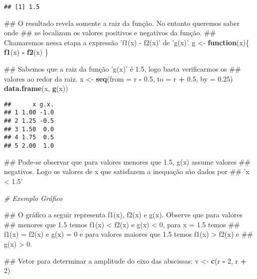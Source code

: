 \documentclass[]{book}
\newenvironment{Shaded}{\begin{snugshade}}{\end{snugshade}}
\newcommand{\KeywordTok}[1]{\textcolor[rgb]{0.13,0.29,0.53}{\textbf{#1}}}
\newcommand{\DataTypeTok}[1]{\textcolor[rgb]{0.13,0.29,0.53}{#1}}
\newcommand{\DecValTok}[1]{\textcolor[rgb]{0.00,0.00,0.81}{#1}}
\newcommand{\FloatTok}[1]{\textcolor[rgb]{0.00,0.00,0.81}{#1}}
\newcommand{\StringTok}[1]{\textcolor[rgb]{0.31,0.60,0.02}{#1}}
\newcommand{\CommentTok}[1]{\textcolor[rgb]{0.56,0.35,0.01}{\textit{#1}}}
\newcommand{\ControlFlowTok}[1]{\textcolor[rgb]{0.13,0.29,0.53}{\textbf{#1}}}
\newcommand{\OperatorTok}[1]{\textcolor[rgb]{0.81,0.36,0.00}{\textbf{#1}}}
\newcommand{\NormalTok}[1]{#1}
\begin{document}
\begin{enumerate}
\begin{verbatim}
## [1] 1.5
\end{verbatim}

\begin{Shaded}
\begin{Highlighting}[]
\NormalTok{##  O resultado revela somente a raiz da função. No entanto queremos saber onde}
\NormalTok{## se localizam os valores positivos e negativos da função.}
\NormalTok{##  Chamaremos nessa etapa a expressão 'f1(x) - f2(x)' de 'g(x)'.}
\NormalTok{g <-}\StringTok{ }\ControlFlowTok{function}\NormalTok{(x)\{}
  \KeywordTok{f1}\NormalTok{(x) }\OperatorTok{-}\StringTok{ }\KeywordTok{f2}\NormalTok{(x)}
\NormalTok{\}}

\NormalTok{##  Sabemos que a raiz da função 'g(x)' é 1.5, logo basta verificarmos os}
\NormalTok{## valores ao redor da raiz.}
\NormalTok{x <-}\StringTok{ }\KeywordTok{seq}\NormalTok{(}\DataTypeTok{from =}\NormalTok{ r }\OperatorTok{-}\StringTok{ }\FloatTok{0.5}\NormalTok{, }\DataTypeTok{to =}\NormalTok{ r }\OperatorTok{+}\StringTok{ }\FloatTok{0.5}\NormalTok{, }\DataTypeTok{by =} \FloatTok{0.25}\NormalTok{)}
\KeywordTok{data.frame}\NormalTok{(x, }\KeywordTok{g}\NormalTok{(x))}
\end{Highlighting}
\end{Shaded}

\begin{verbatim}
##      x g.x.
## 1 1.00 -1.0
## 2 1.25 -0.5
## 3 1.50  0.0
## 4 1.75  0.5
## 5 2.00  1.0
\end{verbatim}

\begin{Shaded}
\begin{Highlighting}[]
\NormalTok{##  Pode-se observar que para valores menores que 1.5, g(x) assume valores}
\NormalTok{## negativos. Logo os valores de x que satisfazem a inequação são dados por}
\NormalTok{## 'x < 1.5'}

\CommentTok{# Exemplo Gráfico}

\NormalTok{##  O gráfico a seguir representa f1(x), f2(x) e g(x). Observe que para valores}
\NormalTok{## menores que 1.5 temos f1(x) < f2(x) e g(x) < 0, para x = 1.5 temos}
\NormalTok{## f1(x) = f2(x) e g(x) = 0 e para valores maiores que 1.5 temos f1(x) > f2(x) e}
\NormalTok{## g(x) > 0.}

\NormalTok{##  Vetor para determinar a amplitude do eixo das abscissas:}
\NormalTok{v <-}\StringTok{ }\KeywordTok{c}\NormalTok{(r }\OperatorTok{-}\StringTok{ }\DecValTok{2}\NormalTok{, r }\OperatorTok{+}\StringTok{ }\DecValTok{2}\NormalTok{)}


\end{Highlighting}
\end{Shaded}
\end{enumerate}
\end{document}

